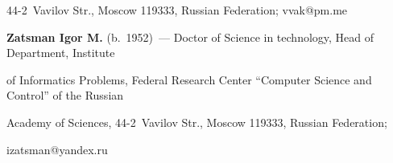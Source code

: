 44-2~Vavilov Str., Moscow 119333, Russian Federation; \mbox{vvak@pm.me} 



\vspace*{3pt}



\noindent

\textbf{Zatsman Igor M.} (b.\ 1952)~--- Doctor of Science in technology, Head of Department, Institute 

of Informatics Problems, Federal Research Center ``Computer Science and Control'' of the Russian 

Academy of Sciences, 44-2~Vavilov Str., Moscow 119333, Russian Federation; 

\mbox{izatsman@yandex.ru}

      



 

     



\label{end\stat}



\renewcommand{\bibname}{\protect\rm Литература} 

\renewcommand{\figurename}{\protect\bf Рис.}


